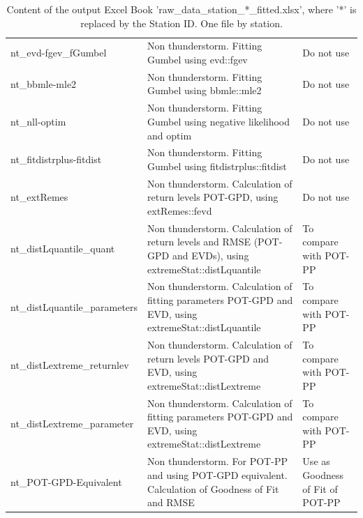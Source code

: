\documentclass[12pt,oneside]{reedthesis}
\begin{document}
\begingroup\fontsize{8}{10}\selectfont
\begin{longtable}[t]{>{\raggedright\arraybackslash}p{1.5in}>{\raggedright\arraybackslash}p{3in}>{\raggedright\arraybackslash}p{1.5in}}
\caption[rawdatastationidfitted]{\label{tab:rawdatastationidfitted}Content of the output Excel Book 'raw\_data\_station\_*\_fitted.xlsx', where '*' is replaced by the Station ID. One file by station.}\\
\toprule
\multicolumn{1}{l}{Excel Sheet Name} & \multicolumn{1}{l}{Description} & \multicolumn{1}{l}{Important}\\
\midrule
nt\_evd-fgev\_fGumbel & Non thunderstorm. Fitting Gumbel using evd::fgev & Do not use\\
nt\_bbmle-mle2 & Non thunderstorm. Fitting Gumbel using bbmle::mle2 & Do not use\\
nt\_nll-optim & Non thunderstorm. Fitting Gumbel using negative likelihood and optim & Do not use\\
nt\_fitdistrplus-fitdist & Non thunderstorm. Fitting Gumbel using fitdistrplus::fitdist & Do not use\\
nt\_extRemes & Non thunderstorm. Calculation of return levels POT-GPD, using extRemes::fevd & Do not use\\
nt\_distLquantile\_quant & Non thunderstorm. Calculation of return levels and RMSE (POT-GPD and EVDs), using extremeStat::distLquantile & To compare with POT-PP\\
nt\_distLquantile\_parameters & Non thunderstorm. Calculation of fitting parameters POT-GPD and EVD, using extremeStat::distLquantile & To compare with POT-PP\\
nt\_distLextreme\_returnlev & Non thunderstorm. Calculation of return levels POT-GPD and EVD, using extremeStat::distLextreme & To compare with POT-PP\\
nt\_distLextreme\_parameter & Non thunderstorm. Calculation of fitting parameters POT-GPD and EVD, using extremeStat::distLextreme & To compare with POT-PP\\
nt\_POT-GPD-Equivalent & Non thunderstorm. For POT-PP and using POT-GPD equivalent. Calculation of Goodness of Fit and RMSE & Use as Goodness of Fit of POT-PP\\
\bottomrule
\end{longtable}
\endgroup{}
\end{document}

